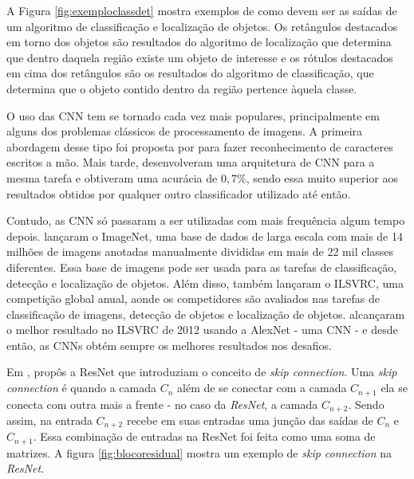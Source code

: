 A Figura \ref{fig:exemploclassdet} mostra exemplos de como devem ser as saídas de um algoritmo de classificação e localização de objetos. Os retângulos destacados em torno dos objetos são resultados do algoritmo de localização que determina que dentro daquela região existe um objeto de interesse e os rótulos destacados em cima dos retângulos são os resultados do algoritmo de classificação, que determina que o objeto contido dentro da região pertence àquela classe.

O uso das \ac{CNN} tem se tornado cada vez mais populares, principalmente em alguns dos problemas clássicos de processamento de imagens. A primeira abordagem desse tipo foi proposta por  para fazer reconhecimento de caracteres escritos a mão. Mais tarde,  desenvolveram uma arquitetura de \ac{CNN} para a mesma tarefa e obtiveram uma acurácia de $0,7\%$, sendo essa muito superior aos resultados obtidos por qualquer outro classificador utilizado até então.

Contudo, as \ac{CNN} só passaram a ser utilizadas com mais frequência algum tempo depois.  lançaram o ImageNet, uma base de dados de larga escala com mais de 14 milhões de imagens anotadas manualmente divididas em mais de 22 mil classes diferentes. Essa base de imagens pode ser usada para as tarefas de classificação, detecção e localização de objetos. Além disso,  também lançaram o \ac{ILSVRC}, uma competição global anual, aonde os competidores são avaliados nas tarefas de classificação de imagens, detecção de objetos e localização de objetos.  alcançaram o melhor resultado no \ac{ILSVRC} de 2012 usando a AlexNet - uma \ac{CNN} - e desde então, as \ac{CNN}s obtém sempre os melhores resultados nos desafios.

Em \citeyear{he-2016}, \citeauthor{he-2016} propôs a \ac{ResNet} que introduziam o conceito de \textit{skip connection}. Uma \textit{skip connection} é quando a camada $C_n$ além de se conectar com a camada $C_{n+1}$ ela se conecta com outra mais a frente - no caso da \textit{\ac{ResNet}}, a camada $C_{n+2}$. Sendo assim, na entrada $C_{n+2}$ recebe em suas entradas uma junção das saídas de $C_{n}$ e $C_{n+1}$. Essa combinação de entradas na \ac{ResNet} foi feita como uma soma de matrizes. A figura \ref{fig:blocoresidual} mostra um exemplo de \textit{skip connection} na \textit{\ac{ResNet}}.

